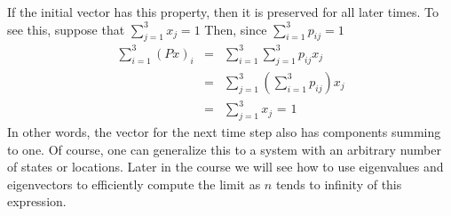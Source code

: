 If the initial vector has this property, then it is preserved for all
later times.  To see this, suppose that $\sum_{j=1}^3x_j=1$ Then,
since $\sum_{i=1}^3p_{ij}=1$
\begin{eqnarray*}
\sum_{i=1}^3 (Px)_i &=&\sum_{i=1}^3 \sum_{j=1}^3 p_{ij}x_j \\
&=&\sum_{j=1}^3\left(\sum_{i=1}^3p_{ij}\right)x_j \\
&=&\sum_{j=1}^3x_j \mbox{\ = \ } 1
\end{eqnarray*}
In other words, the vector for the next time step also has components
summing to one.  Of course, one can generalize this to a system with
an arbitrary number of states or locations. Later in the course we
will see how to use eigenvalues and eigenvectors to efficiently
compute the limit as $n$ tends to infinity of this expression.

